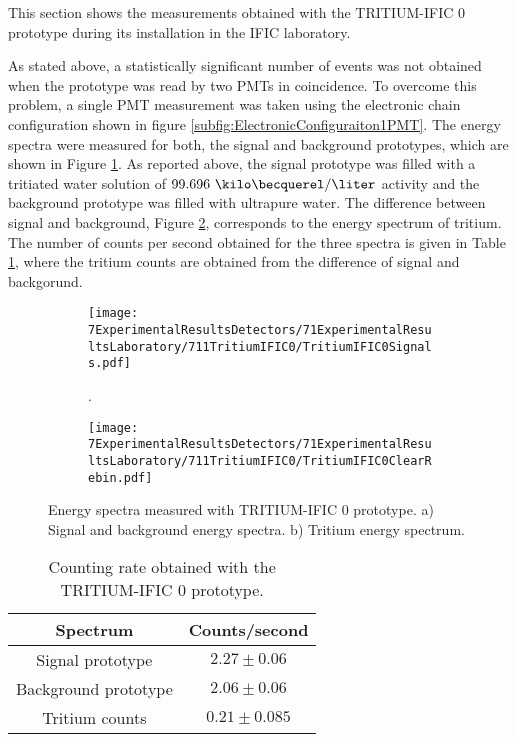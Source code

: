 This section shows the measurements obtained with the TRITIUM-IFIC 0 prototype during its installation in the IFIC laboratory.

As stated above, a statistically significant number of events was not obtained when the prototype was read by two PMTs in coincidence. To overcome this problem, a single PMT measurement was taken using the electronic chain configuration shown in figure \ref{subfig:ElectronicConfiguraiton1PMT}. The energy spectra were measured for both, the signal and background prototypes, which are shown in Figure \ref{subfig:SignalBackgroundEnergySpectraTritiumIFIC0}. As reported above, the signal prototype was filled with a tritiated water solution of $99.696~\kilo\becquerel/\liter$ activity and the background prototype was filled with ultrapure water. The difference between signal and background, Figure \ref{subfig:TritiumEnergySpectraTritiumIFIC0}, corresponds to the energy spectrum of tritium. The number of counts per second obtained for the three spectra is given in Table \ref{tab:CountsPerSecondTRITIUMIFIC0}, where the tritium counts are obtained from the difference of signal and backgorund.


\begin{figure}
\centering
    \begin{subfigure}[b]{1\textwidth}
    \centering
    \texttt{[image: 7ExperimentalResultsDetectors/71ExperimentalResultsLaboratory/711TritiumIFIC0/TritiumIFIC0Signals.pdf]}  
    \caption{.\label{subfig:SignalBackgroundEnergySpectraTritiumIFIC0}}
    \end{subfigure}
    \hfill
    \begin{subfigure}[b]{1\textwidth}
    \centering
    \texttt{[image: 7ExperimentalResultsDetectors/71ExperimentalResultsLaboratory/711TritiumIFIC0/TritiumIFIC0ClearRebin.pdf]}  
    \caption{\label{subfig:TritiumEnergySpectraTritiumIFIC0}}
    \end{subfigure}
 \caption{Energy spectra measured with TRITIUM-IFIC 0 prototype. a) Signal and background energy spectra. b) Tritium energy spectrum.}
 \label{fig:EnergySpectraTRITIUMIFIC0}
\end{figure}

\begin{table}[htbp]
\centering{}%
\begin{tabular}{cc}
\toprule 
Spectrum & Counts/second \tabularnewline
\midrule
\midrule 
Signal prototype & $2.27 \pm 0.06$ \tabularnewline
Background prototype & $2.06 \pm 0.06$ \tabularnewline  
Tritium counts & $0.21 \pm 0.085$ \tabularnewline
\bottomrule
\end{tabular}
\caption{Counting rate obtained with the TRITIUM-IFIC 0 prototype.}
\label{tab:CountsPerSecondTRITIUMIFIC0}
\end{table}

